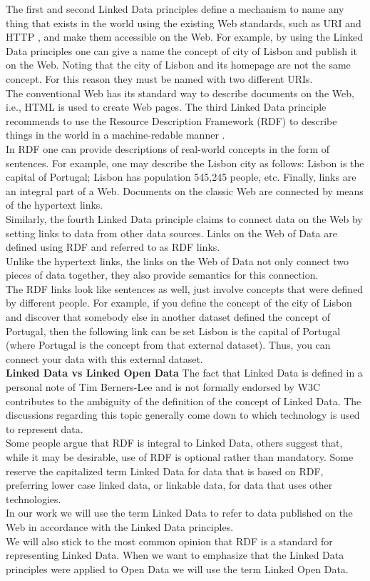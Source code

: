 \documentclass[a4paper,12pt,oneside]{report}
\begin{document}
{{{{The first and second Linked Data principles define a mechanism to name any thing that exists in the world using the existing Web standards, such as URI and HTTP , and make them accessible
on the Web. For example, by using the Linked Data principles one can give a name the concept of city of Lisbon and publish it on the Web. Noting that the city of Lisbon and its homepage are not the same concept. For this reason they must be named with two
different URIs.\\
The conventional Web has its standard way to describe documents on the Web, i.e., HTML is used to create Web pages. The third Linked Data principle recommends to use the Resource Description Framework (RDF) to describe things in the world in a machine-redable manner .\\
 In RDF one can provide descriptions of real-world concepts in the form of sentences. For example, one may describe the Lisbon city as follows: Lisbon is the capital of Portugal; Lisbon has population 545,245 people, etc.
Finally, links are an integral part of a Web. Documents on the classic Web are connected by means of the hypertext links.\\
 Similarly, the fourth Linked Data principle claims to connect data on the Web by setting links to data from other data sources.
Links on the Web of Data are defined using RDF and referred to as RDF links.\\
 Unlike the hypertext links, the links on the Web of Data not only connect two pieces of data together, they also provide semantics for this connection.\\
 The RDF links look like sentences as well, just involve concepts that were defined by different people. For example, if you define the concept of the city of Lisbon and discover that somebody else in another dataset defined the concept of Portugal, then the following link can be set Lisbon is the capital of Portugal (where Portugal is the concept from that external dataset). Thus, you can connect your data with this external dataset.\\
\textbf{Linked Data vs Linked Open Data} The fact that Linked Data is defined in a personal note of Tim Berners-Lee and is not formally endorsed by W3C contributes to the ambiguity of the definition of the concept of Linked Data. The discussions regarding this
topic generally come down to which technology is used to represent data.\\
 Some people argue that RDF is integral to Linked Data, others suggest that, while it may be desirable, use of RDF is optional rather than mandatory. Some reserve the capitalized term
Linked Data for data that is based on RDF, preferring lower case linked data, or linkable data, for data that uses other technologies.\\
 In our work we will use the term Linked Data
to refer to data published on the Web in accordance with the Linked Data principles. \\
We will also stick to the most common opinion that RDF is a standard for representing Linked Data. When we want to emphasize that the Linked Data principles were
applied to Open Data we will use the term Linked Open Data.}
}}}
\end{document}
